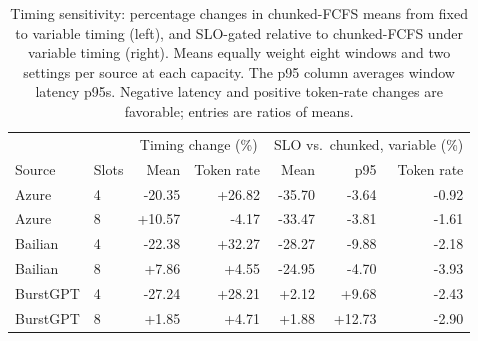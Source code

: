 \begin{table}[t]
\centering\small
\setlength{\tabcolsep}{3pt}
\caption{Timing sensitivity: percentage changes in chunked-FCFS means from fixed to variable timing (left), and SLO-gated relative to chunked-FCFS under variable timing (right). Means equally weight eight windows and two settings per source at each capacity. The p95 column averages window latency p95s. Negative latency and positive token-rate changes are favorable; entries are ratios of means.}
\label{tab:time-sensitivity}
\begin{tabular}{llrrrrr}
\toprule
 & & \multicolumn{2}{c}{Timing change (\%)} & \multicolumn{3}{c}{SLO vs.\ chunked, variable (\%)}\\
Source & Slots & Mean & Token rate & Mean & p95 & Token rate\\
\midrule
Azure & 4 & -20.35 & +26.82 & -35.70 & -3.64 & -0.92\\
Azure & 8 & +10.57 & -4.17 & -33.47 & -3.81 & -1.61\\
Bailian & 4 & -22.38 & +32.27 & -28.27 & -9.88 & -2.18\\
Bailian & 8 & +7.86 & +4.55 & -24.95 & -4.70 & -3.93\\
BurstGPT & 4 & -27.24 & +28.21 & +2.12 & +9.68 & -2.43\\
BurstGPT & 8 & +1.85 & +4.71 & +1.88 & +12.73 & -2.90\\
\bottomrule
\end{tabular}
\end{table}
